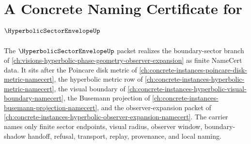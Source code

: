 \chapter{A Concrete Naming Certificate for $\HyperbolicSectorEnvelopeUp$}
\label{ch:concrete-instances-hyperbolic-sector-envelope-namecert}

The $\HyperbolicSectorEnvelopeUp$ packet realizes the boundary-sector branch of \autoref{ch:visions-hyperbolic-phase-geometry-observer-expansion} as finite NameCert data. It sits after the Poincare disk metric of \autoref{ch:concrete-instances-poincare-disk-metric-namecert}, the hyperbolic metric row of \autoref{ch:concrete-instances-hyperbolic-metric-namecert}, the visual boundary of \autoref{ch:concrete-instances-hyperbolic-visual-boundary-namecert}, the Busemann projection of \autoref{ch:concrete-instances-busemann-projection-namecert}, and the observer-expansion packet of \autoref{ch:concrete-instances-hyperbolic-observer-expansion-namecert}. The carrier names only finite sector endpoints, visual radius, observer window, boundary-shadow handoff, refusal, transport, replay, provenance, and local naming.

